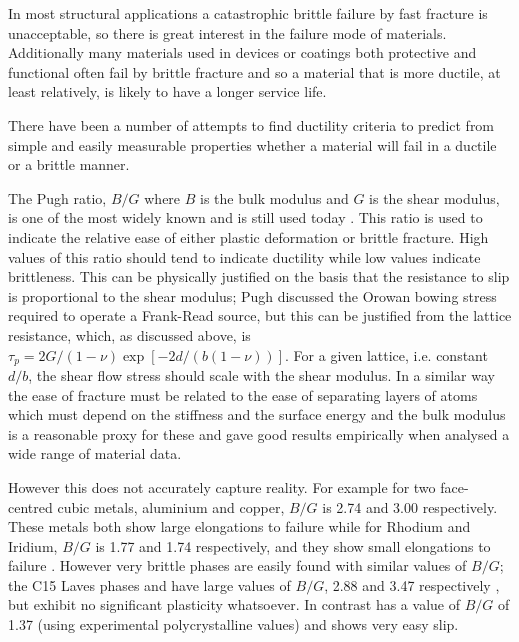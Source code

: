 

In most structural applications a catastrophic brittle failure by fast fracture is unacceptable, so there is great interest in the failure mode of materials. Additionally many materials used in devices or coatings both protective and functional often fail by brittle fracture and so a material that is more ductile, at least relatively, is likely to have a longer service life.

There have been a number of attempts to find ductility criteria to predict from simple and easily measurable properties whether a material will fail in a ductile or a brittle manner.

The Pugh ratio, $B/G$ where $B$ is the bulk modulus and $G$ is the shear modulus, is one of the most widely known and is still used today \cite{Sangiovanni2011,Aryal2014,Wang2015,Hu2016,Zhuang2017}. This ratio is used to indicate the relative ease of either plastic deformation or brittle fracture. High values of this ratio should tend to indicate ductility while low values indicate brittleness. This can be physically justified on the basis that the resistance to slip is proportional to the shear modulus; Pugh discussed the Orowan bowing stress required to operate a Frank-Read source, but this can be justified from the lattice resistance, which, as discussed above, is $\tau_p = 2G / (1-\nu) \exp[-2d/(b(1-\nu))]$. For a given lattice, i.e. constant $d/b$, the shear flow stress should scale with the shear modulus. In a similar way the ease of fracture must be related to the ease of separating layers of atoms which must depend on the stiffness and the surface energy and the bulk modulus is a reasonable proxy for these and gave good results empirically when \citet{Pugh1954} analysed a wide range of material data.

However this does not accurately capture reality. For example for two face-centred cubic metals, aluminium and copper, $B/G$ is 2.74 and 3.00 respectively. These metals both show large elongations to failure while for Rhodium and Iridium, $B/G$ is 1.77 and 1.74 respectively, and they show small elongations to failure \cite{Pugh1954}. However very brittle phases are easily found with similar values of $B/G$; the C15 Laves phases \cite{Stein2004,Stein2005}  and  have large values of $B/G$, 2.88 and 3.47 respectively \cite{Chu1995}, but exhibit no significant plasticity whatsoever. In contrast  has a value of $B/G$ of 1.37 (using experimental polycrystalline values) \cite{Barsoum2011} and shows very easy slip.



